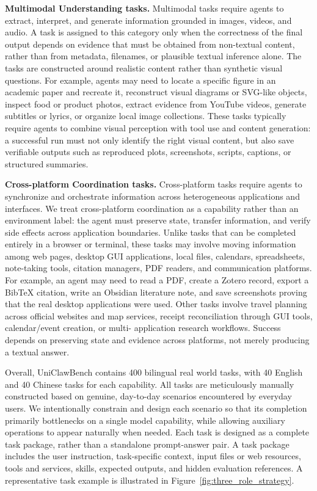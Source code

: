\textbf{Multimodal Understanding tasks.}
Multimodal tasks require agents to extract, interpret, and generate information grounded in images, videos, and audio. A task is assigned to this category only when the correctness of the final output depends on evidence that must be obtained from non-textual content, rather than from metadata, filenames, or
plausible textual inference alone. The tasks are constructed around realistic
content rather than synthetic visual questions. For example, agents may need to locate a specific figure in an academic paper and recreate it, reconstruct visual diagrams or SVG-like objects, inspect food or product photos, extract evidence from YouTube videos, generate subtitles or lyrics, or organize local image collections. These tasks typically require agents to combine visual perception with tool use and content generation: a successful run must not only identify the right visual content, but also save verifiable outputs such as reproduced plots, screenshots, scripts, captions, or structured summaries.

\textbf{Cross-platform Coordination tasks.}
Cross-platform tasks require agents to synchronize and orchestrate information across heterogeneous applications and interfaces. We treat cross-platform coordination as a capability rather than an environment label: the agent must preserve state, transfer information, and verify side effects across application
boundaries.
Unlike tasks that can be completed entirely in a browser or terminal, these tasks may involve moving
information among web pages, desktop GUI applications, local files, calendars,
spreadsheets, note-taking tools, citation managers, PDF readers, and
communication platforms. For example, an agent may need to read a PDF, create
a Zotero record, export a BibTeX citation, write an Obsidian literature note,
and save screenshots proving that the real desktop applications were used.
Other tasks involve travel planning across official websites and map services,
receipt reconciliation through GUI tools, calendar/event creation, or multi-
application research workflows. Success depends on preserving state and
evidence across platforms, not merely producing a textual answer.

Overall, UniClawBench contains 400 bilingual real world tasks, with 40 English and 40 Chinese tasks for each capability. All tasks are meticulously manually constructed based on genuine, day-to-day scenarios encountered by everyday users. We intentionally constrain and design each scenario so that its completion primarily bottlenecks on a single model capability, while allowing auxiliary operations to appear naturally when needed. Each task is designed as a complete task package, rather than a standalone prompt-answer pair.  A task package includes the user instruction, task-specific context, input files or web resources, tools and services, skills, expected outputs, and hidden evaluation references. A representative task example is illustrated in Figure~\ref{fig:three_role_strategy}.

